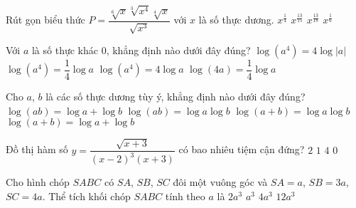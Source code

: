 \begin{ex}%
	Rút gọn biểu thức $P=\dfrac{\sqrt[6]{x}\sqrt[3]{x^4}\sqrt[4]{x}}{\sqrt{x^3}}$ với $x$ là số thực dương.
	\choice
	{\True $x^{\tfrac{1}{4}}$}
	{$x^{\tfrac{13}{15}}$}
	{$x^{\tfrac{13}{18}}$}
	{$x^{\tfrac{1}{6}}$}
\end{ex}

\begin{ex}%
	Với $a$ là số thực khác $0$, khẳng định nào dưới đây đúng?
	\choice
	{\True $\log(a^4)=4\log|a|$}
	{$\log(a^4)=\dfrac{1}{4}\log a$}
	{$\log(a^4)=4\log a$}
	{$\log(4a)=\dfrac{1}{4}\log a$}
\end{ex}

\begin{ex}%
	Cho $a$, $b$ là các số thực dương tùy ý, khẳng định nào dưới đây đúng?
	\choice
	{\True $\log(ab)=\log a+\log b$}
	{$\log(ab)=\log a\log b$}
	{$\log(a+b)=\log a\log b$}
	{$\log(a+b)=\log a+\log b$}
\end{ex}

\begin{ex}%
	Đồ thị hàm số $y=\dfrac{\sqrt{x+3}}{(x-2)^3(x+3)}$ có bao nhiêu tiệm cận đứng?
	\choice
	{\True $2$}
	{$1$}
	{$4$}
	{$0$}
\end{ex}

\begin{ex}%
	Cho hình chóp $SABC$ có $SA$, $SB$, $SC$ đôi một vuông góc và $SA=a$, $SB=3a$, $SC=4a$. Thể tích khối chóp $SABC$ tính theo $a$ là
	\choice
	{\True $2a^3$}
	{$a^3$}
	{$4a^3$}
	{$12a^3$}
\end{ex}

